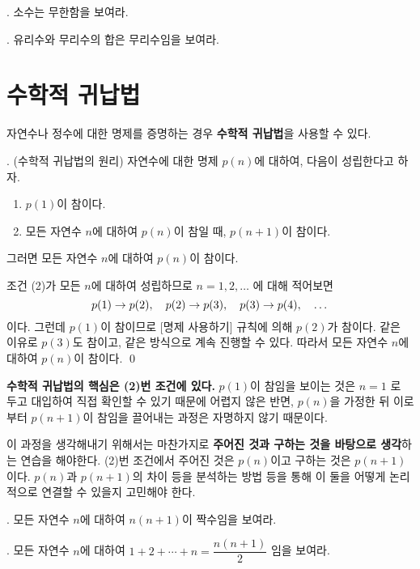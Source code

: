 \vspace*{80px}

\ex. 소수는 무한함을 보여라.

\vspace*{80px}

\ex. 유리수와 무리수의 합은 무리수임을 보여라.

\newpage

\section{수학적 귀납법}

자연수나 정수에 대한 명제를 증명하는 경우 \textbf{수학적 귀납법}을 사용할 수 있다.

\thm. (수학적 귀납법의 원리) 자연수에 대한 명제 \(p(n)\)에 대하여, 다음이 성립한다고 하자.
\begin{enumerate}
    \item \(p(1)\)이 참이다.
    \item 모든 자연수 \(n\)에 대하여 \(p(n)\)이 참일 때, \(p(n+1)\)이 참이다.
\end{enumerate}
그러면 모든 자연수 \(n\)에 대하여 \(p(n)\)이 참이다.

\pf 조건 (2)가 모든 \(n\)에 대하여 성립하므로 \(n = 1, 2, \dots\) 에 대해 적어보면
\[
    p(1) \rightarrow p(2), \quad p(2) \rightarrow p(3), \quad p(3) \rightarrow p(4), \quad \dots
\]
이다. 그런데 \(p(1)\)이 참이므로 [명제 사용하기] 규칙에 의해 \(p(2)\)가 참이다. 같은 이유로 \(p(3)\)도 참이고, 같은 방식으로 계속 진행할 수 있다. 따라서 모든 자연수 \(n\)에 대하여 \(p(n)\)이 참이다. \qed

\textbf{수학적 귀납법의 핵심은 (2)번 조건에 있다.} \(p(1)\)이 참임을 보이는 것은 \(n = 1\) 로 두고 대입하여 직접 확인할 수 있기 때문에 어렵지 않은 반면, \(p(n)\)을 가정한 뒤 이로부터 \(p(n+1)\)이 참임을 끌어내는 과정은 자명하지 않기 때문이다.

이 과정을 생각해내기 위해서는 마찬가지로 \textbf{주어진 것과 구하는 것을 바탕으로 생각}하는 연습을 해야한다. (2)번 조건에서 주어진 것은 \(p(n)\)이고 구하는 것은 \(p(n+1)\)이다. \(p(n)\)과 \(p(n+1)\)의 차이 등을 분석하는 방법 등을 통해 이 둘을 어떻게 논리적으로 연결할 수 있을지 고민해야 한다.

\ex. 모든 자연수 \(n\)에 대하여 \(n(n+1)\)이 짝수임을 보여라.

\vspace*{100px}

\ex. 모든 자연수 \(n\)에 대하여 \(1 + 2 + \cdots + n = \dfrac{n(n+1)}{2}\) 임을 보여라.

\pagebreak

